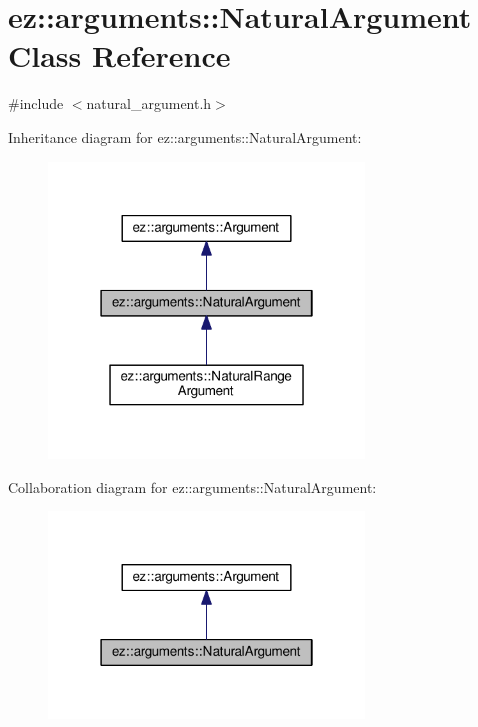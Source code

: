 \hypertarget{classez_1_1arguments_1_1NaturalArgument}{}\section{ez\+:\+:arguments\+:\+:Natural\+Argument Class Reference}
\label{classez_1_1arguments_1_1NaturalArgument}


{\ttfamily \#include $<$natural\+\_\+argument.\+h$>$}



Inheritance diagram for ez\+:\+:arguments\+:\+:Natural\+Argument\+:
\nopagebreak
\begin{figure}[H]
\begin{center}
\leavevmode
\includegraphics[width=238pt]{classez_1_1arguments_1_1NaturalArgument__inherit__graph}
\end{center}
\end{figure}


Collaboration diagram for ez\+:\+:arguments\+:\+:Natural\+Argument\+:
\nopagebreak
\begin{figure}[H]
\begin{center}
\leavevmode
\includegraphics[width=238pt]{classez_1_1arguments_1_1NaturalArgument__coll__graph}
\end{center}
\end{figure}
